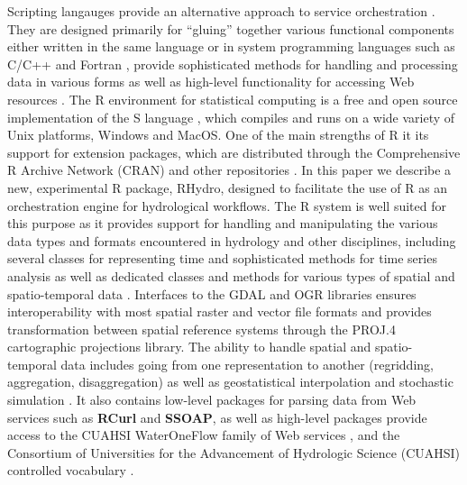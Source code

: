 \documentclass{icldt}\usepackage[]{graphicx}\usepackage[]{color}
\begin{document}
Scripting langauges provide an alternative approach to service orchestration \citep{ousterhout1998,bu2015}. They are designed primarily for ``gluing'' together various functional components either written in the same language or in system programming languages such as C/C++ and Fortran \citep{ousterhout1998}, provide sophisticated methods for handling and processing data in various forms as well as high-level functionality for accessing Web resources \citep{bu2015}. The R environment for statistical computing \citep{R2015} is a free and open source implementation of the S language \citep{chambers2008}, which compiles and runs on a wide variety of Unix platforms, Windows and MacOS. One of the main strengths of R it its support for extension packages, which are distributed through the Comprehensive R Archive Network (CRAN) and other repositories \citep{pebesma2012}. In this paper we describe a new, experimental R package, RHydro, designed to facilitate the use of R as an orchestration engine for hydrological workflows. The R system is well suited for this purpose as it provides support for handling and manipulating the various data types and formats encountered in hydrology and other disciplines, including several classes for representing time and sophisticated methods for time series analysis as well as dedicated classes and methods for various types of spatial and spatio-temporal data \citep{pebesma2012}. Interfaces to the GDAL and OGR libraries ensures interoperability with most spatial raster and vector file formats and provides transformation between spatial reference systems through the PROJ.4 cartographic projections library. The ability to handle spatial and spatio-temporal data includes going from one representation to another (regridding, aggregation, disaggregation) as well as geostatistical interpolation and stochastic simulation \citep{pebesma2004}. It also contains low-level packages for parsing data from Web services such as \textbf{RCurl} and \textbf{SSOAP}, as well as high-level packages provide access to the CUAHSI WaterOneFlow family of Web services \citep{kadlec2015}, and the Consortium of Universities for the Advancement of Hydrologic Science (CUAHSI) controlled vocabulary \citep{horsburgh2009}. \\


\end{document}
